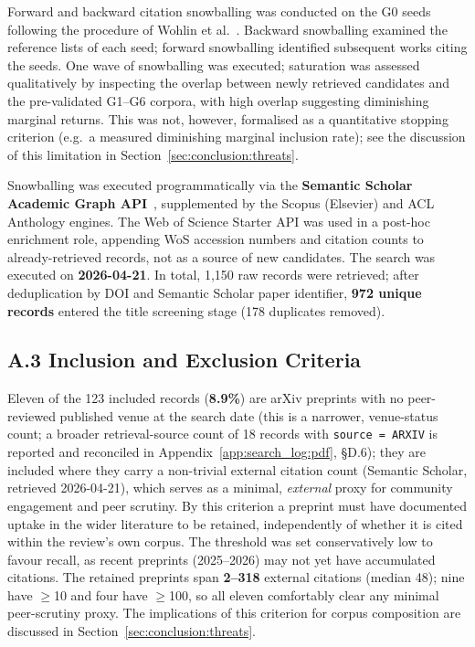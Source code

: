 Forward and backward citation snowballing was conducted on the G0 seeds
following the procedure of Wohlin et al.~\cite{Wohlin2014}. Backward
snowballing examined the reference lists of each seed; forward snowballing
identified subsequent works citing the seeds. One wave of snowballing was
executed; saturation was assessed qualitatively by inspecting the overlap
between newly retrieved candidates and the pre-validated G1--G6 corpora, with
high overlap suggesting diminishing marginal returns. This was not, however,
formalised as a quantitative stopping criterion (e.g.\ a measured diminishing
marginal inclusion rate); see the discussion of this limitation in
Section~\ref{sec:conclusion:threats}.

Snowballing was executed programmatically via the \textbf{Semantic Scholar
Academic Graph API}~\cite{SemanticScholar2023}, supplemented by the Scopus
(Elsevier) and ACL Anthology engines. The Web of Science Starter API was used
in a post-hoc enrichment role, appending WoS accession numbers and citation
counts to already-retrieved records, not as a source of new candidates. The
search was executed on \textbf{2026-04-21}. In total, 1,150 raw records were
retrieved; after deduplication by DOI and Semantic Scholar paper identifier,
\textbf{972 unique records} entered the title screening stage (178 duplicates
removed).

\subsection*{A.3 Inclusion and Exclusion Criteria}

Eleven of the 123 included records (\textbf{8.9\%}) are arXiv preprints with
no peer-reviewed published venue at the search date (this is a narrower,
venue-status count; a broader retrieval-source count of 18 records with
\texttt{source = ARXIV} is reported and reconciled in
Appendix~\ref{app:search_log:pdf}, \S D.6); they are included where
they carry a non-trivial external citation count (Semantic Scholar, retrieved
2026-04-21), which serves as a minimal, \emph{external} proxy for
community engagement and peer scrutiny. By this criterion a preprint must have
documented uptake in the wider literature to be retained, independently of
whether it is cited within the review's own corpus. The threshold was set
conservatively low to favour recall, as recent preprints (2025--2026) may not
yet have accumulated citations. The retained preprints span \textbf{2--318}
external citations (median 48); nine have $\geq$10 and four have $\geq$100,
so all eleven comfortably clear any minimal peer-scrutiny proxy. The
implications of this criterion for corpus composition are discussed in
Section~\ref{sec:conclusion:threats}.

